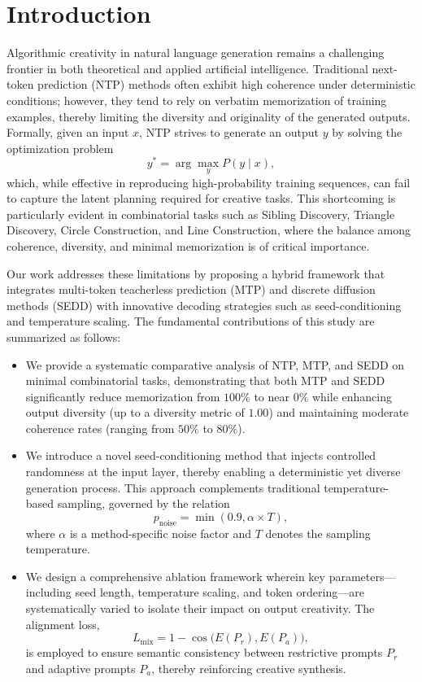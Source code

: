 \documentclass[11pt]{article}
\begin{document}
\section{Introduction}
Algorithmic creativity in natural language generation remains a challenging frontier in both theoretical and applied artificial intelligence. Traditional next-token prediction (NTP) methods often exhibit high coherence under deterministic conditions; however, they tend to rely on verbatim memorization of training examples, thereby limiting the diversity and originality of the generated outputs. Formally, given an input \( x \), NTP strives to generate an output \( y \) by solving the optimization problem
\[
y^* = \arg\max_{y} P(y \mid x),
\]
which, while effective in reproducing high-probability training sequences, can fail to capture the latent planning required for creative tasks. This shortcoming is particularly evident in combinatorial tasks such as Sibling Discovery, Triangle Discovery, Circle Construction, and Line Construction, where the balance among coherence, diversity, and minimal memorization is of critical importance.

Our work addresses these limitations by proposing a hybrid framework that integrates multi-token teacherless prediction (MTP) and discrete diffusion methods (SEDD) with innovative decoding strategies such as seed-conditioning and temperature scaling. The fundamental contributions of this study are summarized as follows:
\begin{itemize}
    \item We provide a systematic comparative analysis of NTP, MTP, and SEDD on minimal combinatorial tasks, demonstrating that both MTP and SEDD significantly reduce memorization from \(100\%\) to near \(0\%\) while enhancing output diversity (up to a diversity metric of \(1.00\)) and maintaining moderate coherence rates (ranging from \(50\%\) to \(80\%\)).
    \item We introduce a novel seed-conditioning method that injects controlled randomness at the input layer, thereby enabling a deterministic yet diverse generation process. This approach complements traditional temperature-based sampling, governed by the relation
    \[
    p_{\text{noise}} = \min(0.9, \alpha \times T),
    \]
    where \(\alpha\) is a method-specific noise factor and \(T\) denotes the sampling temperature.
    \item We design a comprehensive ablation framework wherein key parameters—including seed length, temperature scaling, and token ordering—are systematically varied to isolate their impact on output creativity. The alignment loss,
    \[
    L_{\text{mix}} = 1 - \cos\Big(E(P_r), E(P_a)\Big),
    \]
    is employed to ensure semantic consistency between restrictive prompts \(P_r\) and adaptive prompts \(P_a\), thereby reinforcing creative synthesis.
\end{itemize}
\end{document}
